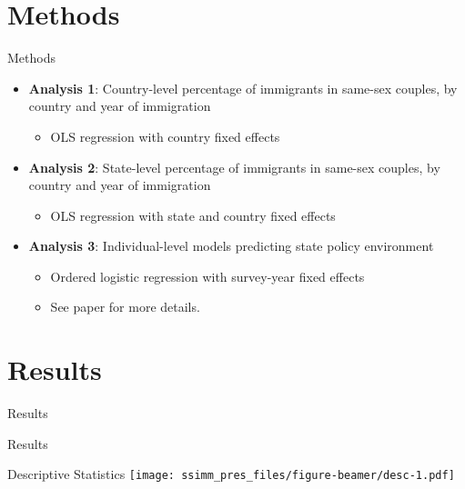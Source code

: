 \documentclass[
  ignorenonframetext,
]{beamer}
\providecommand{\tightlist}{%
  \setlength{\itemsep}{0pt}\setlength{\parskip}{0pt}}
\begin{document}
\hypertarget{methods}{%
\section{Methods}\label{methods}}

\begin{frame}{Methods}
\protect\hypertarget{methods-1}{}
\begin{itemize}
\tightlist
\item
  \textbf{Analysis 1}: Country-level percentage of immigrants in
  same-sex couples, by country and year of immigration

  \begin{itemize}
  \tightlist
  \item
    OLS regression with country fixed effects
  \end{itemize}
\item
  \textbf{Analysis 2}: State-level percentage of immigrants in same-sex
  couples, by country and year of immigration

  \begin{itemize}
  \tightlist
  \item
    OLS regression with state and country fixed effects
  \end{itemize}
\item
  \textbf{Analysis 3}: Individual-level models predicting state policy
  environment

  \begin{itemize}
  \tightlist
  \item
    Ordered logistic regression with survey-year fixed effects
  \item
    See paper for more details.
  \end{itemize}
\end{itemize}
\end{frame}

\hypertarget{results}{%
\section{Results}\label{results}}

\begin{frame}{Results}
\protect\hypertarget{results-1}{}
\begin{center}
  \huge{\textcolor{uclablue}{Results}}
\end{center}
\end{frame}

\begin{frame}{Descriptive Statistics}
\protect\hypertarget{descriptive-statistics}{}
\texttt{[image: ssimm\_pres\_files/figure-beamer/desc-1.pdf]}
\end{frame}
\end{document}
